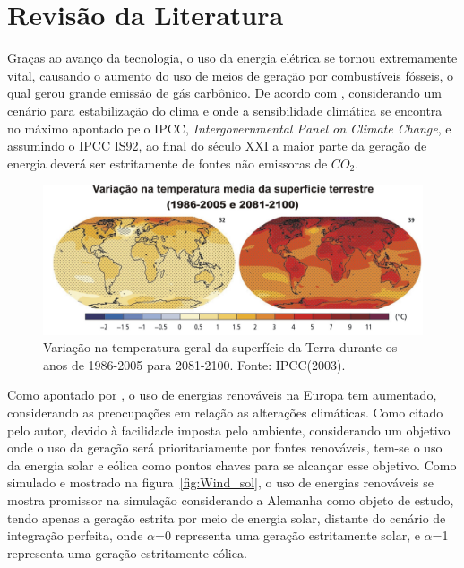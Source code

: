 \chapter{Revisão da Literatura}
\label{cap:02}
Graças ao avanço da tecnologia, o uso da energia elétrica se tornou extremamente vital, causando o aumento do uso de meios de geração por combustíveis fósseis, o qual gerou grande emissão de gás carbônico. De acordo com , considerando um cenário para estabilização do clima e onde a sensibilidade climática se encontra no máximo apontado pelo IPCC, \textit{Intergovernmental Panel on Climate Change}, e assumindo o IPCC IS92, ao final do século XXI a maior parte da geração de energia deverá ser estritamente de fontes não emissoras de $CO_{2}$.

\FloatBarrier
\begin{figure}[htbp]
	\centering
	\includegraphics[scale=1.0]{imagens/Temp_IPCC}
	\caption{Variação na temperatura geral da superfície da Terra durante os anos de 1986-2005 para 2081-2100. Fonte: IPCC(2003). }
	
	\label{fig:TempE}
\end{figure}
\FloatBarrier


Como apontado por , o uso de energias renováveis na Europa tem aumentado, considerando as preocupações em relação as alterações climáticas. Como citado pelo autor, devido à facilidade imposta pelo ambiente, considerando um objetivo onde o uso da geração será prioritariamente por fontes renováveis, tem-se o uso da energia solar e eólica como pontos chaves para se alcançar esse objetivo. Como simulado e mostrado na figura~\ref{fig:Wind_sol}, o uso de energias renováveis se mostra promissor na simulação considerando a Alemanha como objeto de estudo, tendo apenas a geração estrita por meio de energia solar, distante do cenário de integração perfeita, onde $\alpha$=0 representa uma geração estritamente solar, e $\alpha$=1 representa uma geração estritamente eólica.

